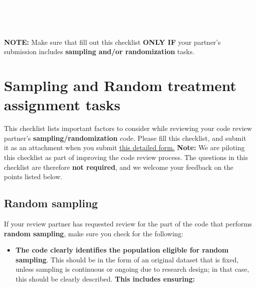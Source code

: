 \documentclass{tufte-handout}
\newcommand{\dimeTextField}[3]{\TextField[name=#1, height=0.3cm, width=#2, bordercolor=gray]{#3}}
\newcommand{\titleBox}[1]{
	\begin{tcolorbox}
		[colframe = fontcolor,
		colback = fontcolor,
		sharp corners,
		halign = flush center,
		valign = center,
		height = 0.3\textwidth,
		after skip = 1cm]
		#1
	\end{tcolorbox}
}
\begin{document}
	\begin{fullwidth}
		
		\titleBox{
			\textcolor{white}{\LARGE{\textbf{DIME Analytics \\ Peer Code Review - Sampling and Random Treatment Assignment}} \\
				\Large\textbf{{v2.0}}}
		}

  \dimeTextField{time}{2.5 cm}{Reviewer:} 

        \dimeTextField{time}{2.5 cm} {Coder:}
		
		\textbf{NOTE:} Make sure that fill out this checklist \textbf{ONLY IF} your partner's submission includes    \textbf{sampling and/or randomization} tasks. 
		
		\section*{Sampling and Random treatment assignment tasks}
  This checklist lists important factors to consider while reviewing your code review partner's \textbf{sampling/randomization} code. Please fill this checklist, and submit it as an attachment when you submit \href{https://survey.wb.surveycto.com/collect/code_review_summary?caseid=}{this detailed form.}
  \hfill \break 
  \break
  \textbf{Note:} We are piloting this checklist as part of improving the code review process. The questions in this checklist are therefore \textbf{not required}, and we welcome your feedback on the points listed below.

  
		
   

    \subsection*{Random sampling}

   If your review partner has requested review for the part of the code that performs \textbf{random sampling}, make sure you check for the following: 
            \begin{itemize}
            
            \item \textbf{The code clearly identifies the population eligible for random sampling}. This should be in the form of an original dataset that is fixed, unless sampling is continuous or ongoing due to research design; in that case, this should be clearly described.
            \hfill \break 
            \textbf{This includes ensuring:}
            

\end{itemize}
\end{fullwidth}
\end{document}
